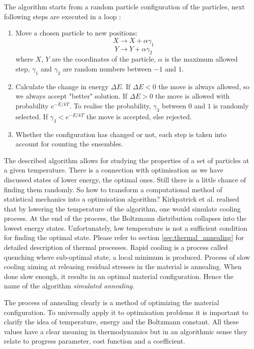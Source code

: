 The algorithm starts from a random particle configuration of the particles, next following steps are executed in a loop :
\begin{enumerate}
	\item Move a chosen particle to new positions:
		\[X\rightarrow X+\alpha\gamma_1\]
		\[Y\rightarrow Y+\alpha\gamma_2\]
	where $X$, $Y$ are the coordinates of the particle, $\alpha$ is the maximum allowed step, $\gamma_1$ and $\gamma_2$ are random numbers between $-1$ and $1$.
	\item Calculate the change in energy $\Delta E$. If $\Delta E<0$ the move is always allowed, so we always accept "better" solution. If $\Delta E>0$ the move is allowed with probability $e^{-E/kT}$. To realise the probability, $\gamma_3$ between $0$ and $1$ is randomly selected. If $\gamma_3<e^{-E/kT}$ the move is accepted, else rejected.
	\item Whether the configuration has changed or not, each step is taken into account for counting the ensembles.
\end{enumerate}
The described algorithm allows for studying the properties of a set of particles at a given temperature. There is a connection with optimisation as we have discussed states of lower energy, the optimal ones. Still there is a little chance of finding them randomly. So how to transform a computational method of statistical mechanics into a optimisation algorithm? Kirkpatrick et al. realised that by lowering the temperature of the algorithm, one would simulate cooling process. At the end of the process, the Boltzmann distribution collapses into the lowest energy states.
Unfortunately, low temperature is not a sufficient condition for finding  the optimal state. Please refer to section \ref{sec:thermal_annealing} for detailed description of thermal processes. Rapid cooling is a process called quenching where sub-optimal state, a local minimum is produced. Process of slow cooling aiming at releasing residual stresses in the material is annealing. When done slow enough, it results in an optimal material configuration. Hence the name of the algorithm \emph{simulated annealing}.

The process of annealing clearly is a method of optimizing the material configuration. To universally apply it to optimisation problems it is important to clarify the idea of temperature, energy and the Boltzmann constant. All these values have a clear meaning in thermodynamics but in an algorithmic sense they relate to progress parameter, cost function and a coefficient.

